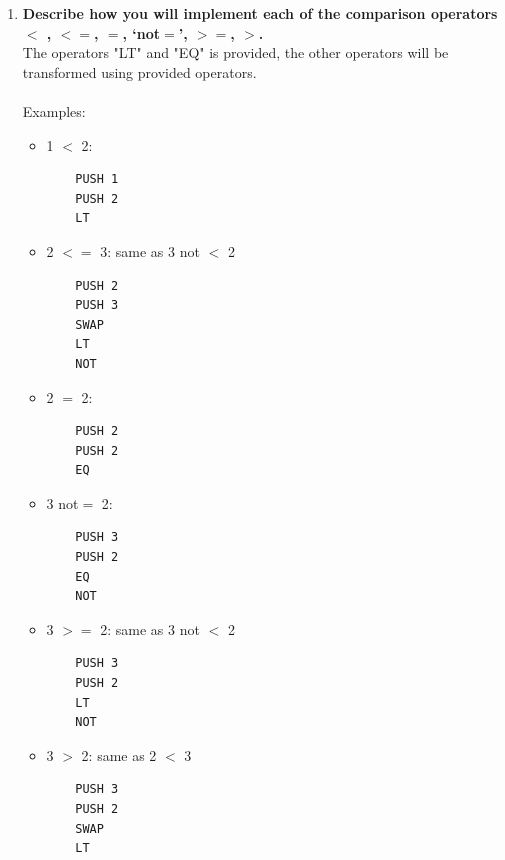 \documentclass[11pt]{article}
\begin{document}
\begin{enumerate}[label=(\alph*)]
\item \textbf{Describe how you will implement each of the comparison
    operators $<$ , $<=$, $=$, `not$=$', $>=$, $>$.}\\
The operators "LT" and "EQ" is provided, the other operators will be
transformed using provided operators.\\
\\
Examples:
\begin{itemize}
\item 1 $<$ 2:
\begin{lstlisting}
    PUSH 1
    PUSH 2
    LT
\end{lstlisting}
\item 2 $<=$ 3: same as 3 not $<$ 2
\begin{lstlisting}
    PUSH 2
    PUSH 3
    SWAP
    LT
    NOT
\end{lstlisting}
\item 2 $=$ 2:
\begin{lstlisting}
    PUSH 2
    PUSH 2
    EQ
\end{lstlisting}
\item 3 not$=$ 2:
\begin{lstlisting}
    PUSH 3
    PUSH 2
    EQ
    NOT
\end{lstlisting}
\item 3 $>=$ 2: same as 3 not $<$ 2
\begin{lstlisting}
    PUSH 3
    PUSH 2
    LT
    NOT
\end{lstlisting}
\item 3 $>$ 2: same as 2 $<$ 3
\begin{lstlisting}
    PUSH 3
    PUSH 2
    SWAP
    LT
\end{lstlisting}
\end{itemize}


\end{enumerate}
\end{document}
